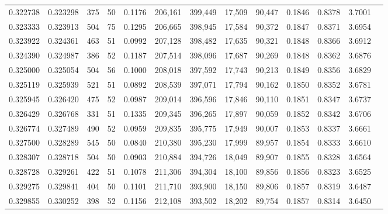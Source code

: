 \begin{tabular}{rrrrrrrrrrrrr}
0.322738 & 0.323298 &    375 &    50 &                                     0.1176 & 206,161 & 399,449 &  17,509 &  90,447 & 0.1846 & 0.8378 & 3.7001 \\
0.323333 & 0.323913 &    504 &    75 &                                     0.1295 & 206,665 & 398,945 &  17,584 &  90,372 & 0.1847 & 0.8371 & 3.6954 \\
0.323922 & 0.324361 &    463 &    51 &                                     0.0992 & 207,128 & 398,482 &  17,635 &  90,321 & 0.1848 & 0.8366 & 3.6912 \\
0.324390 & 0.324987 &    386 &    52 &                                     0.1187 & 207,514 & 398,096 &  17,687 &  90,269 & 0.1848 & 0.8362 & 3.6876 \\
0.325000 & 0.325054 &    504 &    56 &                                     0.1000 & 208,018 & 397,592 &  17,743 &  90,213 & 0.1849 & 0.8356 & 3.6829 \\
0.325119 & 0.325939 &    521 &    51 &                                     0.0892 & 208,539 & 397,071 &  17,794 &  90,162 & 0.1850 & 0.8352 & 3.6781 \\
0.325945 & 0.326420 &    475 &    52 &                                     0.0987 & 209,014 & 396,596 &  17,846 &  90,110 & 0.1851 & 0.8347 & 3.6737 \\
0.326429 & 0.326768 &    331 &    51 &                                     0.1335 & 209,345 & 396,265 &  17,897 &  90,059 & 0.1852 & 0.8342 & 3.6706 \\
0.326774 & 0.327489 &    490 &    52 &                                     0.0959 & 209,835 & 395,775 &  17,949 &  90,007 & 0.1853 & 0.8337 & 3.6661 \\
0.327500 & 0.328289 &    545 &    50 &                                     0.0840 & 210,380 & 395,230 &  17,999 &  89,957 & 0.1854 & 0.8333 & 3.6610 \\
0.328307 & 0.328718 &    504 &    50 &                                     0.0903 & 210,884 & 394,726 &  18,049 &  89,907 & 0.1855 & 0.8328 & 3.6564 \\
0.328728 & 0.329261 &    422 &    51 &                                     0.1078 & 211,306 & 394,304 &  18,100 &  89,856 & 0.1856 & 0.8323 & 3.6525 \\
0.329275 & 0.329841 &    404 &    50 &                                     0.1101 & 211,710 & 393,900 &  18,150 &  89,806 & 0.1857 & 0.8319 & 3.6487 \\
0.329855 & 0.330252 &    398 &    52 &                                     0.1156 & 212,108 & 393,502 &  18,202 &  89,754 & 0.1857 & 0.8314 & 3.6450 \\

\end{tabular}
